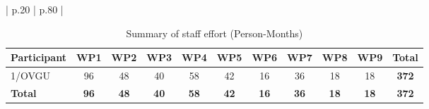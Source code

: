 \documentclass[11pt, a4paper]{article}
\begin{document}
\begin{longtable}{| p{} | p{} |}
\begin{table}[H]
    \centering
    \caption{Summary of staff effort (Person-Months)}
    \label{tab:staff_effort}
    \small
    \begin{tabular}{l c c c c c c c c c c}
        \toprule
        \textbf{Participant} & \textbf{WP1} & \textbf{WP2} & \textbf{WP3} & \textbf{WP4} & \textbf{WP5} & \textbf{WP6} & \textbf{WP7} & \textbf{WP8} & \textbf{WP9} & \textbf{Total} \\
        \midrule
        1/OVGU & 96 & 48 & 40 & 58 & 42 & 16 & 36 & 18 & 18 & \textbf{372} \\
        \midrule
        \textbf{Total} & \textbf{96} & \textbf{48} & \textbf{40} & \textbf{58} & \textbf{42} & \textbf{16} & \textbf{36} & \textbf{18} & \textbf{18} & \textbf{372} \\
        \bottomrule
    \end{tabular}
\end{table}



\end{longtable}
\end{document}
